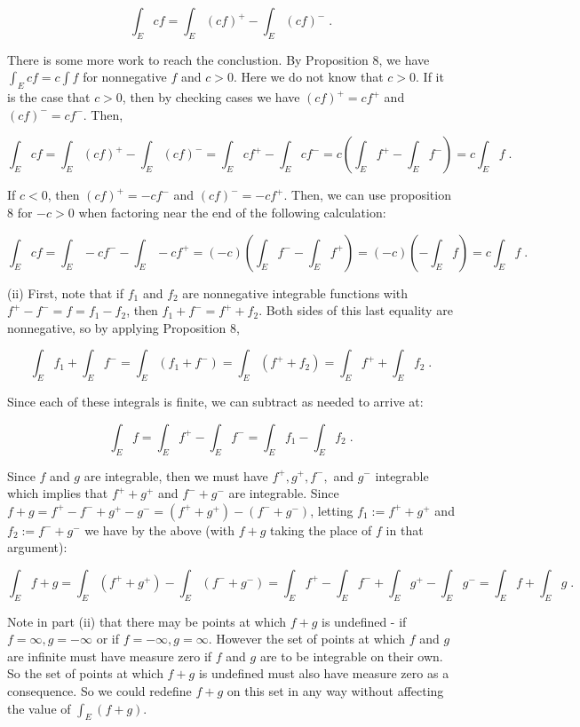\documentclass[a4paper]{article}
\begin{document}
$$\int_E cf = \int_E (cf)^+ - \int_E (cf)^- \;.$$

There is some more work to reach the conclustion. By Proposition 8, we have $\int_E cf = c\int f$ for nonnegative $f$ and $c>0$. Here we do not know that $c>0$. If it is the case that $c> 0$, then by checking cases we have $(cf)^+ = cf^+$ and $(cf)^- = cf^-$. Then,

$$\int_E cf = \int_E (cf)^+ - \int_E (cf)^- = \int_E cf^+ - \int_E cf^- = c\left(\int_E f^+ - \int_E f^-\right) = c\int_E f \;.$$

If $c<0$, then $(cf)^+ = -cf^-$ and $(cf)^- = -cf^+$. Then, we can use proposition 8 for $-c>0$ when factoring near the end of the following calculation:

$$\int_E cf = \int_E -cf^- - \int_E -cf^+ = (-c)\left(\int_E f^- - \int_E f^+ \right) = (-c)\left(-\int_E f\right) = c\int_E f \;.$$

(ii) First, note that if $f_1$ and $f_2$ are nonnegative integrable functions with $f^+ - f^- =f = f_1 - f_2$, then $f_1 + f^- = f^+ + f_2$. Both sides of this last equality are nonnegative, so by applying Proposition 8,

$$\int_E f_1 + \int_E f^- = \int_E (f_1 + f^-) = \int_E (f^+ + f_2) = \int_E f^+ + \int_E f_2 \;.$$

Since each of these integrals is finite, we can subtract as needed to arrive at:

$$\int_E f = \int_E f^+ - \int_E f^- = \int_E f_1 - \int_E f_2 \;.$$

Since $f$ and $g$ are integrable, then we must have $f^+,g^+, f^-,$ and $g^-$ integrable which implies that $f^+ + g^+$ and $f^- + g^-$ are integrable. Since $f+g = f^+ - f^- + g^+ - g^- = (f^+ + g^+) - (f^- + g^-)$, letting $f_1 := f^+ + g^+$ and $f_2 := f^- + g^-$ we have by the above (with $f+g$ taking the place of $f$ in that argument):

$$\int_E f+g = \int_E (f^+ + g^+) - \int_E (f^- + g^-)  = \int_E f^+ - \int_E f^- + \int_E g^+  - \int_E g^- = \int_E f + \int_E g \;.$$

Note in part (ii) that there may be points at which $f+g$ is undefined - if $f = \infty, g= -\infty$ or if $f = -\infty, g = \infty$. However the set of points at which $f$ and $g$ are infinite must have measure zero if $f$ and $g$ are to be integrable on their own. So the set of points at which $f+g$ is undefined must also have measure zero as a consequence. So we could redefine $f+g$ on this set in any way without affecting the value of $\int_E (f+g)$. \\
\end{document}
